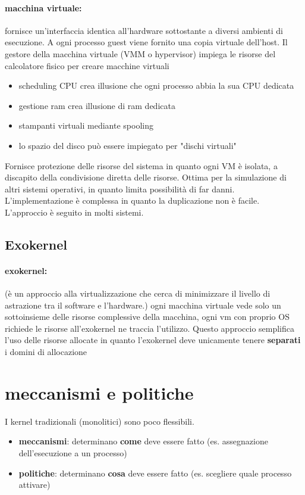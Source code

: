 \documentclass{article}
\begin{document}
\paragraph{macchina virtuale:} fornisce un'interfaccia identica all'hardware sottostante a diversi ambienti di esecuzione.\newline
A ogni processo guest viene fornito una copia virtuale dell'host. \newline
Il gestore della macchina virtuale (VMM o hypervisor) impiega le risorse del calcolatore fisico per creare macchine virtuali
\begin{itemize}
    \item scheduling CPU crea illusione che ogni processo abbia la sua CPU dedicata
    \item gestione ram crea illusione di ram dedicata
    \item stampanti virtuali mediante spooling
    \item lo spazio del disco può essere impiegato per "dischi virtuali"
\end{itemize}
Fornisce protezione delle risorse del sistema in quanto ogni VM è isolata, a discapito della condivisione diretta delle risorse. 
Ottima per la simulazione di altri sistemi operativi, in quanto limita possibilità di far danni. L'implementazione è complessa in quanto 
la duplicazione non è facile. L'approccio è seguito in molti sistemi.

\subsection{Exokernel}
\paragraph{exokernel:} (è un approccio alla virtualizzazione che cerca di minimizzare il livello di astrazione tra il software e l'hardware.)
ogni macchina virtuale vede solo un sottoinsieme delle risorse complessive della macchina, ogni vm con proprio OS richiede le risorse all'exokernel 
ne traccia l'utilizzo. Questo approccio semplifica l'uso delle risorse allocate in quanto l'exokernel deve unicamente tenere \textbf{separati} i 
domini di allocazione

\section{meccanismi e politiche}
I kernel tradizionali (monolitici) sono poco flessibili.
\begin{itemize}
    \item \textbf{meccanismi}: determinano \textbf{come} deve essere fatto (es. assegnazione dell'esecuzione a un processo)
    \item \textbf{politiche}: determinano \textbf{cosa} deve essere fatto (es. scegliere quale processo attivare)
\end{itemize}
\end{document}
